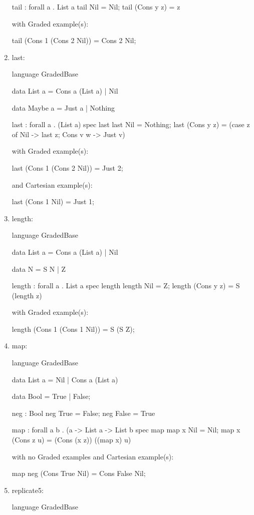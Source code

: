 \begin{enumerate}
\begin{granule}
tail : forall a . List a %
tail Nil = Nil;
tail (Cons y z) = z
\end{granule}
with Graded example(s):
\begin{granule}
tail (Cons 1 (Cons 2 Nil)) = Cons 2 Nil;
\end{granule}
\item last: 
\begin{granule}
language GradedBase

data List a = Cons a (List a) | Nil
    
data Maybe a = Just a | Nothing    
    
last : forall a . (List a) %
spec
    last %
last Nil = Nothing;
last (Cons y z) = 
    (case z of
        Nil -> last z;
        Cons v w -> Just v)
\end{granule}
with Graded example(s):
\begin{granule}
last (Cons 1 (Cons 2 Nil)) = Just 2;
\end{granule}
and Cartesian example(s):
\begin{granule}
last (Cons 1 Nil) = Just 1;
\end{granule}
\item length: 
\begin{granule}
language GradedBase 

data List a = Cons a (List a) | Nil 
    
data N = S N | Z
    
length : forall a . List a %
spec
    length %
length Nil = Z;
length (Cons y z) = S (length z)
\end{granule}
with Graded example(s):
\begin{granule}
length (Cons 1 (Cons 1 Nil)) = S (S Z);
\end{granule}
\item map: 
\begin{granule}
language GradedBase

data List a = Nil | Cons a (List a) 
    
data Bool = True | False; 
    
neg : Bool %
neg True = False;
neg False = True 
    
map : forall a b 
    . (a %
    -> List a %
    -> List b
spec 
    map %
map x Nil = Nil;
map x (Cons z u) = (Cons (x z)) ((map x) u)
\end{granule}
with no Graded examples and Cartesian example(s):
\begin{granule}
map neg (Cons True Nil) = Cons False Nil;
\end{granule}
\item replicate5: 
\begin{granule}
language GradedBase


\end{granule}
\end{enumerate}
